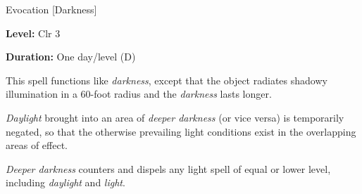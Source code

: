 
Evocation [Darkness]

\textbf{Level:} Clr 3

\textbf{Duration:} One day/level (D)

This spell functions like \textit{darkness}, except that the object radiates shadowy 
illumination in a 60-foot radius and the \textit{darkness} lasts longer.

\textit{Daylight} brought into an area of \textit{deeper darkness} (or vice versa) 
is temporarily negated, so that the otherwise prevailing light conditions exist 
in the overlapping areas of effect.

\textit{Deeper darkness} counters and dispels any light spell of equal or lower 
level, including \textit{daylight} and \textit{light}.

